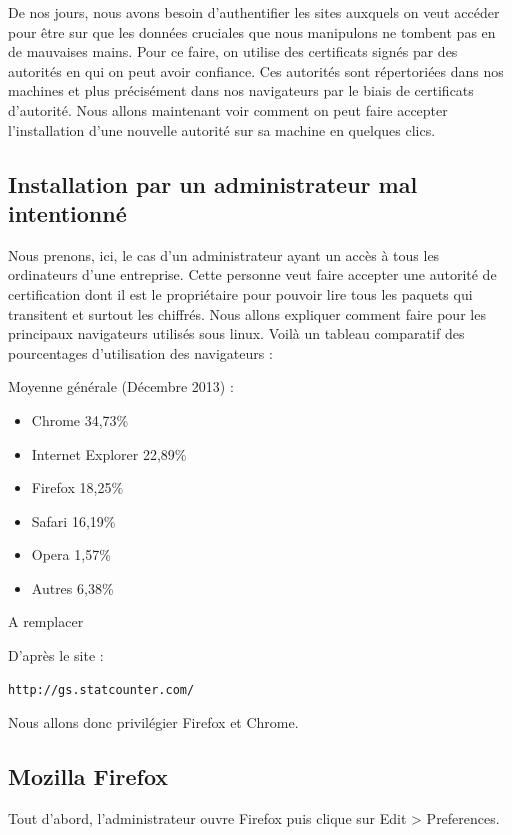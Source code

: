 De nos jours, nous avons besoin d'authentifier les sites auxquels on veut accéder pour être sur que les données cruciales que nous manipulons ne tombent pas en de mauvaises mains. Pour ce faire, on utilise des certificats signés par des autorités en qui on peut avoir confiance.
Ces autorités sont répertoriées dans nos machines et plus précisément dans nos navigateurs par le biais de certificats d'autorité.
Nous allons maintenant voir comment on peut faire accepter l'installation d'une nouvelle autorité sur sa machine en quelques clics.




\subsection{Installation par un administrateur mal intentionné}
Nous prenons, ici, le cas d'un administrateur ayant un accès à tous les ordinateurs d'une entreprise.
Cette personne veut faire accepter une autorité de certification dont il est le propriétaire pour pouvoir lire tous les paquets qui transitent et surtout les chiffrés.
Nous allons expliquer comment faire pour les principaux navigateurs utilisés sous linux.
Voilà un tableau comparatif des pourcentages d'utilisation des navigateurs : 

Moyenne générale (Décembre 2013) :
\begin{itemize}
\item{Chrome} 		34,73\%
\item{Internet Explorer}		 22,89\%
\item{Firefox} 		18,25\%
\item{Safari} 		16,19\%
\item{Opera}	 		1,57\%	
\item{Autres} 		6,38\%
\end{itemize}	

\huge{}
A remplacer

\normalsize{}

D'après le site : \begin{verbatim}
http://gs.statcounter.com/
\end{verbatim}

Nous allons donc privilégier Firefox et Chrome.
\newpage
\subsection{Mozilla Firefox}

Tout d'abord, l'administrateur ouvre Firefox puis clique sur Edit > Preferences.


